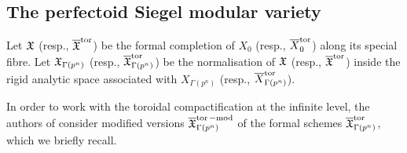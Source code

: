 \subsection{The perfectoid Siegel modular variety}\label{subsection: perfectoid Siegel modular variety}
Let $\operatorname{\mathfrak{X}}$ (resp., $\overline{\operatorname{\mathfrak{X}}}^{\operatorname{tor}}$) be the formal completion of $X_0$ (resp., $\overline{X}_0^{\operatorname{tor}}$) along its special fibre. Let $\operatorname{\mathfrak{X}}_{\Gamma(p^n)}$ (resp., $\overline{\operatorname{\mathfrak{X}}}^{\operatorname{tor}}_{\Gamma(p^n)}$) be the normalisation of $\operatorname{\mathfrak{X}}$ (resp., $\overline{\operatorname{\mathfrak{X}}}^{\operatorname{tor}}$) inside the rigid analytic space associated with $X_{\Gamma(p^n)}$ (resp., $\overline{X}^{\operatorname{tor}}_{\Gamma(p^n)}$). 

In order to work with the toroidal compactification at the infinite level, the authors of \cite{Pilloni-Stroh-CoherentCohomologyandGaloisRepresentations} consider modified versions $\overline{\operatorname{\mathfrak{X}}}_{\Gamma(p^n)}^{\operatorname{tor}-\text{mod}}$ of the formal schemes $\overline{\operatorname{\mathfrak{X}}}_{\Gamma(p^n)}^{\operatorname{tor}}$, which we briefly recall. 


